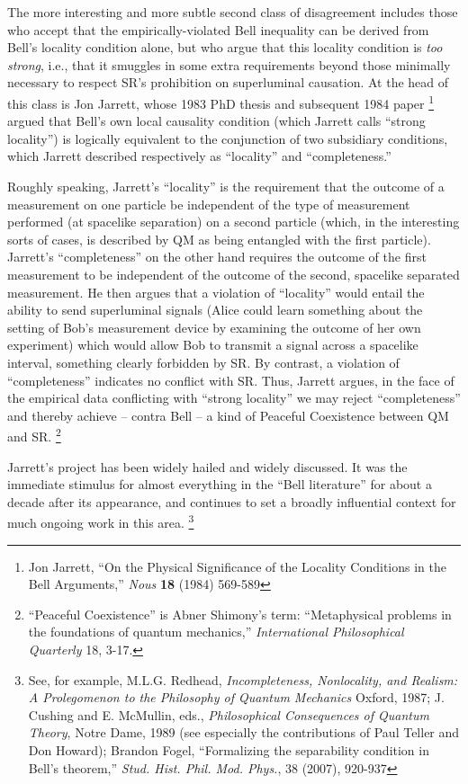 \documentclass[aps,prc,twocolumn]{revtex4}
\begin{document}
The more interesting and more subtle second class of disagreement 
includes those who accept that the empirically-violated Bell
inequality can be derived from Bell's locality condition alone, but
who argue that this locality condition is \emph{too strong}, i.e., 
that it smuggles in some extra requirements beyond those
minimally necessary to respect SR's prohibition on superluminal
causation.  At the head of this class is Jon Jarrett, whose 1983 
PhD thesis and subsequent 1984 paper 
\footnote{Jon Jarrett, ``On the Physical Significance of the Locality
  Conditions in the Bell Arguments,'' \emph{Nous} {\bf{18}} (1984) 569-589}
argued that Bell's own local causality condition (which Jarrett calls 
``strong locality'') is logically equivalent to
the conjunction of two subsidiary conditions, which Jarrett described
respectively as ``locality'' and ``completeness.'' 

Roughly speaking, Jarrett's ``locality'' is the requirement that the
outcome of a measurement on one particle be independent of the type of
measurement performed (at spacelike separation) on a second particle
(which, in the interesting sorts of cases, is described by QM as being
entangled with the first particle).  Jarrett's ``completeness'' on the
other hand requires the outcome of the first measurement to be
independent of the outcome of the second, spacelike separated
measurement.  He then argues that a violation of ``locality'' would
entail the ability to send superluminal signals (Alice could learn
something about the setting of Bob's measurement device by examining
the outcome of her own experiment) which would allow Bob to transmit
a signal across a spacelike interval, something clearly forbidden
by SR.  By contrast, a violation of ``completeness'' indicates no
conflict with SR.  Thus, Jarrett
argues, in the face of the empirical data conflicting with ``strong
locality'' we may reject ``completeness'' and thereby achieve -- contra
Bell -- a kind of Peaceful Coexistence between QM and SR.  
\footnote{``Peaceful Coexistence'' is Abner Shimony's term:  
  ``Metaphysical problems in the foundations of quantum mechanics,''
  \emph{International Philosophical Quarterly} 18, 3-17.}

Jarrett's project has been widely hailed and widely discussed.  It was
the immediate stimulus for almost everything in the ``Bell
literature'' for about a decade after its appearance, and continues to
set a broadly influential context for much ongoing work in this area.
\footnote{See, for example, M.L.G. Redhead, \emph{Incompleteness,
    Nonlocality, and Realism: A Prolegomenon to the Philosophy of
    Quantum Mechanics} Oxford, 1987; J. Cushing and E. McMullin, eds.,
  \emph{Philosophical Consequences of Quantum Theory}, Notre Dame,
  1989 (see especially the contributions of Paul Teller and Don
  Howard); Brandon Fogel, ``Formalizing the separability condition in
  Bell's theorem,'' \emph{Stud. Hist. Phil. Mod. Phys.}, 38 (2007),
  920-937} 
\end{document}
